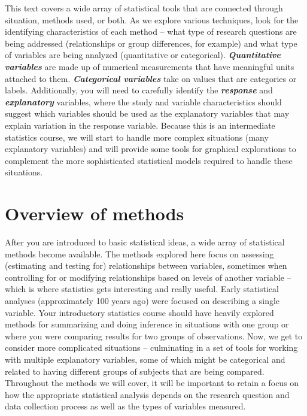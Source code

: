 \documentclass[]{book}
\renewcommand{\indent}{\hspace{15pt}}
\begin{document}
\indent This text covers a wide array of statistical tools that are connected through situation, methods used,
or both. As we explore various techniques, look for the identifying characteristics
of each method -- what type of research questions are being addressed
(relationships or group differences, for example) and what type of variables
are being analyzed (quantitative or categorical). \textbf{\emph{Quantitative variables}}  are made up of numerical measurements that have meaningful units attached to
them. \textbf{\emph{Categorical variables}}  take on values that are categories or labels.
Additionally, you will need to carefully identify the \textbf{\emph{response}}  and \textbf{\emph{explanatory}}  variables, where
the study and variable characteristics should suggest which variables should be used
as the explanatory variables that may explain
variation in the response variable. Because this is an intermediate statistics
course, we will start to handle more complex situations (many explanatory
variables) and will provide some tools for graphical explorations to complement
the more sophisticated statistical models required to handle these situations.

\hypertarget{section1-1}{%
\section{Overview of methods}\label{section1-1}}

After you are introduced to basic statistical ideas, a wide array of statistical methods become
available. The methods explored here focus on assessing (estimating and testing
for) relationships between variables, sometimes when controlling for or
modifying relationships based on levels of another variable -- which is where statistics gets interesting and really useful. Early statistical analyses (approximately 100 years ago) were
focused on describing a single variable. Your introductory statistics course
should have heavily explored methods for summarizing and doing inference in
situations with one group or where you were comparing results for two groups of
observations. Now, we get to consider more complicated situations -- culminating
in a set of tools for working with multiple explanatory variables, some of
which might be categorical and related to having different groups of subjects
that are being compared. Throughout the methods we will cover, it will be
important to retain a focus on how the appropriate statistical analysis depends
on the research question and data collection process as well as the types of
variables measured.
\end{document}
